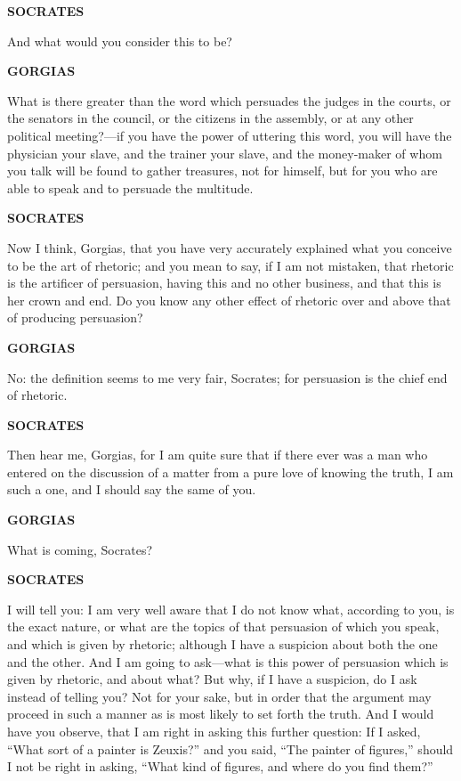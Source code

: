 \documentclass[11pt,letter]{article}
\begin{document}
\par \textbf{SOCRATES}
\par   And what would you consider this to be?

\par \textbf{GORGIAS}
\par   What is there greater than the word which persuades the judges in the courts, or the senators in the council, or the citizens in the assembly, or at any other political meeting?—if you have the power of uttering this word, you will have the physician your slave, and the trainer your slave, and the money-maker of whom you talk will be found to gather treasures, not for himself, but for you who are able to speak and to persuade the multitude.

\par \textbf{SOCRATES}
\par   Now I think, Gorgias, that you have very accurately explained what you conceive to be the art of rhetoric; and you mean to say, if I am not mistaken, that rhetoric is the artificer of persuasion, having this and no other business, and that this is her crown and end. Do you know any other effect of rhetoric over and above that of producing persuasion?

\par \textbf{GORGIAS}
\par   No:  the definition seems to me very fair, Socrates; for persuasion is the chief end of rhetoric.

\par \textbf{SOCRATES}
\par   Then hear me, Gorgias, for I am quite sure that if there ever was a man who entered on the discussion of a matter from a pure love of knowing the truth, I am such a one, and I should say the same of you.

\par \textbf{GORGIAS}
\par   What is coming, Socrates?

\par \textbf{SOCRATES}
\par   I will tell you:  I am very well aware that I do not know what, according to you, is the exact nature, or what are the topics of that persuasion of which you speak, and which is given by rhetoric; although I have a suspicion about both the one and the other. And I am going to ask—what is this power of persuasion which is given by rhetoric, and about what? But why, if I have a suspicion, do I ask instead of telling you? Not for your sake, but in order that the argument may proceed in such a manner as is most likely to set forth the truth. And I would have you observe, that I am right in asking this further question:  If I asked, “What sort of a painter is Zeuxis?” and you said, “The painter of figures,” should I not be right in asking, “What kind of figures, and where do you find them?”
\end{document}
